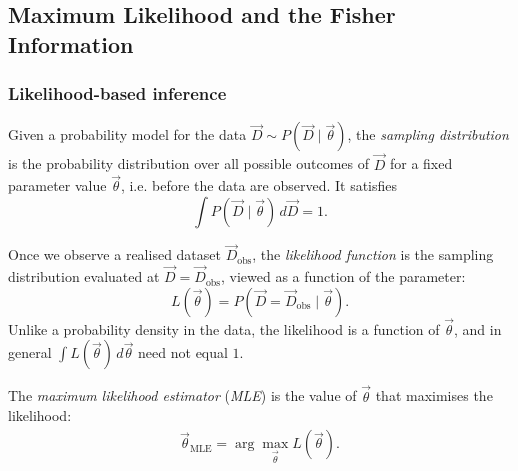 \documentclass[11pt, titlepage]{article} %
\numberwithin{equation}{section}
\theoremstyle{definition}
\numberwithin{assumption}{section}
\begin{document}

\subsection{Maximum Likelihood and the Fisher Information}

\subsubsection*{Likelihood-based inference}

Given a probability model for the data $\vec D\sim P(\vec D\mid \vec\theta)$, the \textit{sampling distribution} is the probability distribution over all possible outcomes of $\vec D$ for a fixed parameter value $\vec\theta$, i.e. before the data are observed. It satisfies
\begin{equation*}
    \int P(\vec D\mid \vec\theta)\,d\vec D=1.
\end{equation*}

Once we observe a realised dataset $\vec D_{\mathrm{obs}}$, the \textit{likelihood function} is the sampling distribution evaluated at $\vec D=\vec D_{\mathrm{obs}}$, viewed as a function of the parameter:
\begin{equation*}
    L(\vec\theta)=P(\vec D=\vec D_{\mathrm{obs}}\mid \vec\theta).
\end{equation*}
Unlike a probability density in the data, the likelihood is a function of $\vec\theta$, and in general $\int L(\vec\theta)\,d\vec\theta$
need not equal $1$.

The \textit{maximum likelihood estimator} (\textit{MLE}) is the value of $\vec\theta$ that maximises the likelihood:
\begin{equation*}
    \hat{\vec\theta}_{\mathrm{MLE}}=\arg\max_{\vec\theta} L(\vec\theta).
\end{equation*}

\end{document}
